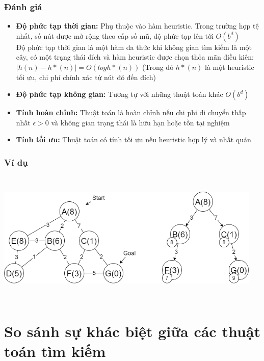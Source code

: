 \documentclass{article}
\begin{document}
\subsubsection{Đánh giá}
\begin{itemize}
    \item \textbf{Độ phức tạp thời gian:} Phụ thuộc vào hàm heuristic. Trong trường hợp tệ nhất, số nút được mở rộng theo cấp số mũ, độ phức tạp lên tới $O(b^d)$ \vspace{2pt}\\
     Độ phức tạp thời gian là một hàm đa thức khi không gian tìm kiếm là một cây, có một trạng thái đích và hàm heuristic được chọn thỏa mãn điều kiên:$| h(n) - h*(n) | = O(log h*(n) )$ (Trong đó $h*(n)$ là một heuristic tối ưu, chi phí chính xác từ nút đó đến đích)
    \item \textbf{Độ phức tạp không gian:} Tương tự với những thuật toán khác $O(b^d)$ 
    \item \textbf{Tính hoàn chỉnh: }Thuật toán là hoàn chỉnh nếu chi phi di chuyển thấp nhất $\epsilon > 0$ và không gian trạng thái là hữu hạn hoặc tồn tại nghiệm
    \item \textbf{Tính tối ưu: }Thuật toán có tính tối ưu nếu heuristic hợp lý và nhất quán
    
\end{itemize}

\subsubsection{Ví dụ}
    \centerline{\includegraphics[width=5in, height=2.5in]{image/astar.png}}
    \vspace{2\baselineskip}
\section{So sánh sự khác biệt giữa các thuật toán tìm kiếm}
\end{document}
